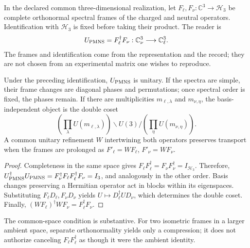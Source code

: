\begin{definition}
In the declared common three-dimensional realization, let
\(F_\ell,F_\nu:\mathbb C^3\to\mathcal H_3\) be complete orthonormal
spectral frames of the charged and neutral operators. Identification
with \(\mathcal H_3\) is fixed before taking their product. The reader is
\begin{equation}
 U_{\rm PMNS}=F_\ell^\dagger F_\nu:
 \mathbb C^3_\nu\longrightarrow\mathbb C^3_\ell.
 \label{eq:ii-pmns-frames}
\end{equation}
The frames and identification come from the representation and the
record; they are not chosen from an experimental matrix one wishes
to reproduce.
\end{definition}

\begin{theorem}
Under the preceding identification, \(U_{\rm PMNS}\) is unitary.
If the spectra are simple, their frame changes are diagonal phases
and permutations; once spectral order is fixed, the phases remain.
If there are multiplicities \(m_{\ell,\lambda}\) and \(m_{\nu,\eta}\), the
basis-independent object is the double coset
\begin{equation}
 \left(\prod_\lambda U(m_{\ell,\lambda})\right)
 \backslash U(3) /
 \left(\prod_\eta U(m_{\nu,\eta})\right).
 \label{eq:ii-pmns-double-class}
\end{equation}
A common unitary refinement \(W\) intertwining both operators
preserves transport when the frames are prolonged as
\(F'_\ell=WF_\ell\), \(F'_\nu=WF_\nu\).
\end{theorem}

\begin{proof}
Completeness in the same space gives
\(F_\ell F_\ell^\dagger=F_\nu F_\nu^\dagger=I_{\mathcal H_3}\).
Therefore,
\(U_{\rm PMNS}^\dagger U_{\rm PMNS}
=F_\nu^\dagger F_\ell F_\ell^\dagger F_\nu=I_3\), and analogously
in the other order. Basis changes preserving a Hermitian operator
act in blocks within its eigenspaces. Substituting
\(F_\ell D_\ell,F_\nu D_\nu\) yields
\(U\mapsto D_\ell^\dagger UD_\nu\), which determines the double coset.
Finally, \((WF_\ell)^\dagger WF_\nu=F_\ell^\dagger F_\nu\).
\end{proof}

The common-space condition is substantive. For two isometric frames in
a larger ambient space, separate orthonormality yields only a
compression; it does not authorize canceling \(F_\ell F_\ell^\dagger\) as though
it were the ambient identity.

